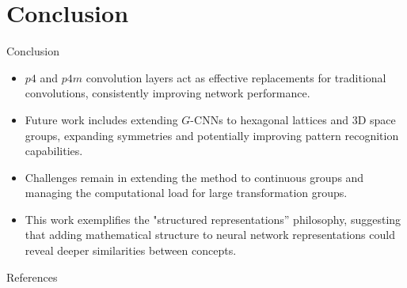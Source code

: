 \documentclass{beamer}
\begin{document}
\section{Conclusion}
\begin{frame}{Conclusion}
    \begin{itemize}
        \item $p4$ and $p4m$ convolution layers act as effective replacements for traditional convolutions, consistently improving network performance.
        \item Future work includes extending $G$-CNNs to hexagonal lattices and 3D space groups, expanding symmetries and potentially improving pattern recognition capabilities.
        \item Challenges remain in extending the method to continuous groups and managing the computational load for large transformation groups.
        \item This work exemplifies the "structured representations” philosophy, suggesting that adding mathematical structure to neural network representations could reveal deeper similarities between concepts.
      \end{itemize}
\end{frame}

\begin{frame}{References}

\end{frame}
\end{document}
